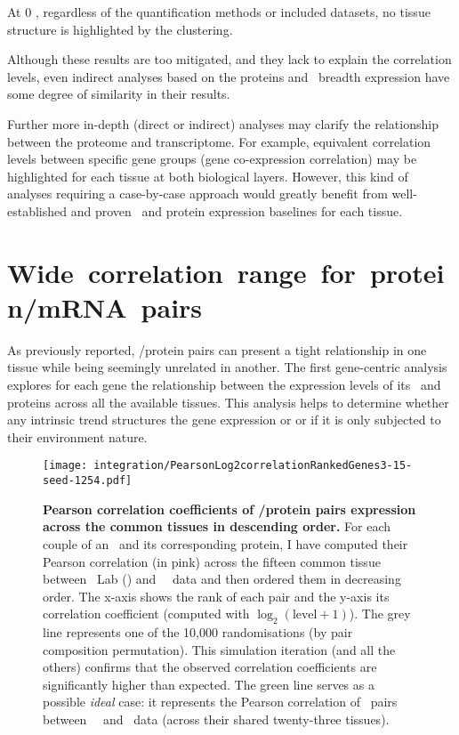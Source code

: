 At $0$ \FPKM, regardless of the quantification methods or included datasets,
no tissue structure is highlighted by the clustering.

Although these results are too mitigated, and
they lack to explain the correlation levels,
even indirect analyses based on the proteins and \mRNAs\ breadth expression
have some degree of similarity in their results.

Further more in-depth (direct or indirect)  analyses
may clarify the relationship between the proteome and transcriptome.
For example, equivalent correlation levels between specific gene groups
(gene co-expression correlation) may be highlighted
for each tissue at both biological layers.
However, this kind of analyses requiring a case-by-case approach
would greatly benefit from
well-established and proven \mRNA\ and protein expression baselines
for each tissue.


\section{Wide~correlation~range~for~protein/mRNA~pairs}
As previously reported, %
\mRNA/protein pairs can present
a tight relationship in one tissue
while being seemingly unrelated in another.
The first gene-centric analysis explores for each gene
the relationship between the expression levels of its \mRNAs\ and proteins
across all the available tissues.
This analysis helps to determine
whether any intrinsic trend structures the gene expression or
or if it is only subjected to their environment nature.

\begin{figure}[!htb]
    \texttt{[image: integration/PearsonLog2correlationRankedGenes3-15-seed-1254.pdf]}\centering
    \vspace{-2mm}
    \caption[Pearson correlation coefficients of \mRNA/protein pairs expression
    across the common tissues in descending order]
    {\label{fig:GeneProtCor}\textbf{Pearson correlation coefficients of \mRNA/protein
    pairs expression across the common tissues in descending order.}
    For each couple of an \mRNA\ and its corresponding protein,
    I have computed their Pearson correlation (in pink)
    across the fifteen common tissue
    between \pandey\ Lab (\PPKM) and \uhlen\ \etal\ data
    and then ordered them in decreasing order.
    The x-axis shows the rank of each pair
    and the y-axis its correlation coefficient
    (computed with $\log_2(\text{level}+1)$).
    The grey line represents one of the 10,000 randomisations
    (by pair composition permutation).
    This simulation iteration (and all the others) confirms
    that the observed correlation coefficients are
    significantly higher than expected.
    The green line serves as a possible \emph{ideal} case:
    it represents the Pearson correlation of \mRNAs\ pairs
    between \uhlen\ \etal\ and \gtex\ data
    (across their shared twenty-three tissues).
    }
    \vspace{-1em}
\end{figure}

